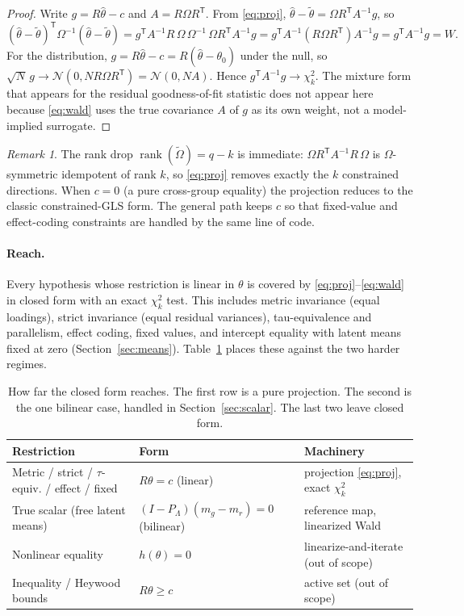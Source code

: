 \documentclass[11pt]{article}
\newcommand{\T}{^{\mathsf T}}
\newcommand{\rank}{\operatorname{rank}}
\newcommand{\Om}{\Omega}
\theoremstyle{plain}
\theoremstyle{remark}
\newtheorem*{remark}{Remark}
\begin{document}
\begin{proof}
Write $g = R\hat\theta - c$ and $A = R\Om R\T$. From \eqref{eq:proj},
$\hat\theta - \tilde\theta = \Om R\T A^{-1} g$, so
\[
  (\hat\theta-\tilde\theta)\T \Om^{-1}(\hat\theta-\tilde\theta)
  = g\T A^{-1} R\, \Om\, \Om^{-1}\, \Om R\T A^{-1} g
  = g\T A^{-1}(R\Om R\T)A^{-1} g
  = g\T A^{-1} g = W .
\]
For the distribution, $g = R\hat\theta - c = R(\hat\theta - \theta_0)$ under the
null, so $\sqrt N\, g \to \mathcal N(0, N R\Om R\T) = \mathcal N(0, N A)$. Hence
$g\T A^{-1} g \to \chi^2_k$. The mixture form that appears for the residual
goodness-of-fit statistic does not appear here because \eqref{eq:wald} uses the
true covariance $A$ of $g$ as its own weight, not a model-implied surrogate.
\end{proof}

\begin{remark}
The rank drop $\rank(\tilde\Om) = q-k$ is immediate: $\Om R\T A^{-1} R\,\Om$ is
$\Om$-symmetric idempotent of rank $k$, so \eqref{eq:proj} removes exactly the
$k$ constrained directions. When $c = 0$ (a pure cross-group equality) the
projection reduces to the classic constrained-GLS form. The general path keeps
$c$ so that fixed-value and effect-coding constraints are handled by the same
line of code.
\end{remark}

\paragraph{Reach.} Every hypothesis whose restriction is linear in $\theta$ is
covered by \eqref{eq:proj}--\eqref{eq:wald} in closed form with an exact
$\chi^2_k$ test. This includes metric invariance (equal loadings), strict
invariance (equal residual variances), tau-equivalence and parallelism, effect
coding, fixed values, and intercept equality with latent means fixed at zero
(Section~\ref{sec:means}). Table~\ref{tab:reach} places these against the two
harder regimes.

\begin{table}[h]
\centering
\begin{tabular}{lll}
\hline
Restriction & Form & Machinery \\
\hline
Metric / strict / $\tau$-equiv. / effect / fixed & $R\theta = c$ (linear)
  & projection \eqref{eq:proj}, exact $\chi^2_k$ \\
True scalar (free latent means) & $(I-P_\Lambda)(m_g - m_r) = 0$ (bilinear)
  & reference map, linearized Wald \\
Nonlinear equality & $h(\theta)=0$ & linearize-and-iterate (out of scope) \\
Inequality / Heywood bounds & $R\theta \ge c$ & active set (out of scope) \\
\hline
\end{tabular}
\caption{How far the closed form reaches. The first row is a pure projection.
The second is the one bilinear case, handled in Section~\ref{sec:scalar}. The
last two leave closed form.}
\label{tab:reach}
\end{table}
\end{document}
